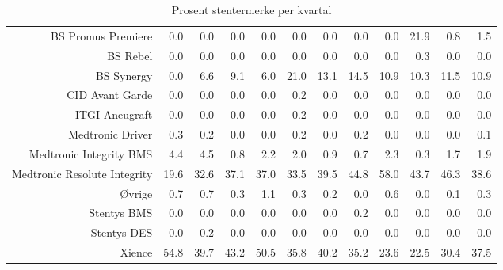 \documentclass[presentation,xcolor=pdftex,dvipsnames,table]{beamer}
\begin{document}
\begin{frame}
\begin{tiny}
\begin{table}[ht]
\begin{tabular}{rrrrrrrrrrrr}
  BS Promus Premiere & 0.0 & 0.0 & 0.0 & 0.0 & 0.0 & 0.0 & 0.0 & 0.0 & 21.9 & 0.8 & 1.5 \\ 
  BS Rebel & 0.0 & 0.0 & 0.0 & 0.0 & 0.0 & 0.0 & 0.0 & 0.0 & 0.3 & 0.0 & 0.0 \\ 
  BS Synergy & 0.0 & 6.6 & 9.1 & 6.0 & 21.0 & 13.1 & 14.5 & 10.9 & 10.3 & 11.5 & 10.9 \\ 
  CID Avant Garde & 0.0 & 0.0 & 0.0 & 0.0 & 0.2 & 0.0 & 0.0 & 0.0 & 0.0 & 0.0 & 0.0 \\ 
  ITGI Aneugraft & 0.0 & 0.0 & 0.0 & 0.0 & 0.2 & 0.0 & 0.0 & 0.0 & 0.0 & 0.0 & 0.0 \\ 
  Medtronic Driver & 0.3 & 0.2 & 0.0 & 0.0 & 0.2 & 0.0 & 0.2 & 0.0 & 0.0 & 0.0 & 0.1 \\ 
  Medtronic Integrity BMS & 4.4 & 4.5 & 0.8 & 2.2 & 2.0 & 0.9 & 0.7 & 2.3 & 0.3 & 1.7 & 1.9 \\ 
  Medtronic Resolute Integrity & 19.6 & 32.6 & 37.1 & 37.0 & 33.5 & 39.5 & 44.8 & 58.0 & 43.7 & 46.3 & 38.6 \\ 
  Øvrige & 0.7 & 0.7 & 0.3 & 1.1 & 0.3 & 0.2 & 0.0 & 0.6 & 0.0 & 0.1 & 0.3 \\ 
  Stentys BMS & 0.0 & 0.0 & 0.0 & 0.0 & 0.0 & 0.0 & 0.2 & 0.0 & 0.0 & 0.0 & 0.0 \\ 
  Stentys DES & 0.0 & 0.2 & 0.0 & 0.0 & 0.0 & 0.0 & 0.0 & 0.0 & 0.0 & 0.0 & 0.0 \\ 
  Xience & 54.8 & 39.7 & 43.2 & 50.5 & 35.8 & 40.2 & 35.2 & 23.6 & 22.5 & 30.4 & 37.5 \\ 
   \bottomrule
\end{tabular}
\caption{Prosent stentermerke per kvartal} 
\end{table}\end{tiny}
\end{frame}
\end{document}
